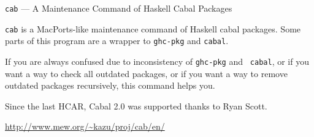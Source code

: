\begin{hcarentry}{{\tt cab} --- A Maintenance Command of Haskell Cabal Packages}
\makeheader

{\tt cab} is a MacPorts-like maintenance command of Haskell cabal packages.
Some parts of this program are a wrapper to {\tt ghc-pkg} and {\tt cabal}.

If you are always confused due to inconsistency of {\tt ghc-pkg} and {\tt
cabal}, or if you want a way to check all outdated packages, or if you want a
way to remove outdated packages recursively, this command helps you.

Since the last HCAR, Cabal 2.0 was supported thanks to Ryan Scott.

\FurtherReading
  \url{http://www.mew.org/~kazu/proj/cab/en/}
\end{hcarentry}
